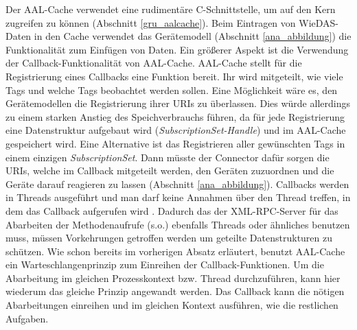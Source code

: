Der AAL-Cache verwendet eine rudimentäre C-Schnittstelle, um auf den Kern zugreifen zu können (Abschnitt \ref{gru_aalcache}).
Beim Eintragen von WieDAS-Daten in den Cache verwendet das Gerätemodell (Abschnitt \ref{ana_abbildung}) die Funktionalität
zum Einfügen von Daten.
Ein größerer Aspekt ist die Verwendung der Callback-Funktionalität von AAL-Cache.
AAL-Cache stellt für die Registrierung eines Callbacks eine Funktion bereit.
Ihr wird mitgeteilt, wie viele Tags und welche Tags beobachtet werden sollen.
Eine Möglichkeit wäre es, den Gerätemodellen die Registrierung ihrer URIs zu überlassen.
Dies würde allerdings zu einem starken Anstieg des Speichverbrauchs führen, da für jede Registrierung eine
Datenstruktur aufgebaut wird (\emph{SubscriptionSet-Handle}) und im AAL-Cache gespeichert wird.
Eine Alternative ist das Registrieren aller gewünschten Tags in einem einzigen \emph{SubscriptionSet}.
Dann müsste der Connector dafür sorgen die URIs, welche im Callback mitgeteilt werden, den Geräten zuzuordnen
und die Geräte darauf reagieren zu lassen (Abschnitt \ref{ana_abbildung}).
Callbacks werden in Threads ausgeführt und man darf keine Annahmen über den Thread treffen, in dem das
Callback aufgerufen wird \cite{aalcache}.
Dadurch das der XML-RPC-Server für das Abarbeiten der Methodenaufrufe (s.o.) ebenfalls Threads oder ähnliches
benutzen muss, müssen Vorkehrungen getroffen werden um geteilte Datenstrukturen zu schützen.
Wie schon bereits im vorherigen Absatz erläutert, benutzt AAL-Cache ein Warteschlangenprinzip zum Einreihen
der Callback-Funktionen.
Um die Abarbeitung im gleichen Prozesskontext bzw. Thread durchzuführen, kann hier wiederum das gleiche
Prinzip angewandt werden.
Das Callback kann die nötigen Abarbeitungen einreihen und im gleichen Kontext ausführen, wie die restlichen
Aufgaben.

